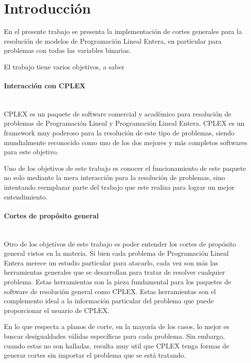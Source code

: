 \section{Introducci\'on}

En el presente trabajo se presenta la implementaci\'on de cortes generales para la resoluci\'on de modelos de Programaci\'on Lineal Entera, en particular para problemas con todas las variables binarias.

El trabajo tiene varios objetivos, a saber

\paragraph{Interacci\'on con CPLEX} \\

CPLEX es un paquete de software comercial y acad\'emico para resoluci\'on de problemas de Programaci\'on Lineal y Programaci\'on Lineal Entera. CPLEX es un framework muy poderoso para la resoluci\'on de este tipo de problemas, siendo mundialmente reconocido como uno de los dos mejores y m\'as completos softwares para este objetivo.

Uno de los objetivos de este trabajo es conocer el funcionamiento de este paquete no solo mediante la mera interacci\'on para la resoluci\'on de problemas, sino intentando reemplazar parte del trabajo que este realiza para lograr un mejor entendimiento.



\paragraph{Cortes de prop\'osito general} \\

Otro de los objetivos de este trabajo es poder entender los cortes de prop\'osito general vistos en la materia. Si bien cada problema de Programaci\'on Lineal Entera merece un estudio particular para atacarlo, cada vez son m\'as las herramientas generales que se desarrollan para tratar de resolver cualquier problema. Estas herramientas son la pieza fundamental para los paquetes de software de resoluci\'on general como CPLEX. Estas herramientas son el complemento ideal a la informaci\'on particular del problema que puede proporcionar el usuario de CPLEX.

En lo que respecta a planos de corte, en la mayor\'ia de los casos, lo mejor es buscar desigualdades v\'alidas espec\'ificas para cada problema. Sin embargo, cuando estas no son halladas, resulta muy util que CPLEX tenga formas de generar cortes sin importar el problema que se est\'a tratando. 

